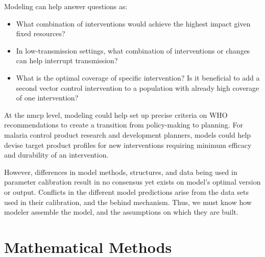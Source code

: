 \documentclass[a4paper, 12pt, twoside]{report}
\begin{document}
Modeling can help answer questions as:

\begin{itemize}
	\item What combination of interventions would achieve the highest impact given fixed resources?
	\item In low-transmission settings, what combination of interventions or changes can help interrupt transmission?
	\item What is the optimal coverage of specific intervention? Is it beneficial to add a second vector control intervention to a population with already high coverage of one intervention?
\end{itemize}

At the \gls{nmcp} level, modeling could help set up precise criteria on WHO recommendations to create a transition from policy-making to planning.
For malaria control product research and development planners, models could help devise target product profiles for new interventions requiring minimum efficacy and durability of an intervention.

However, differences in model methods, structures, and data being used in parameter calibration result in no consensus yet exists on model's optimal version or output.
Conflicts in the different model predictions arise from the data sets used in their calibration, and the behind mechanism.
Thus, we must know how modeler assemble the model, and the assumptions on which they are built.

\chapter{Mathematical Methods}


\end{document}

